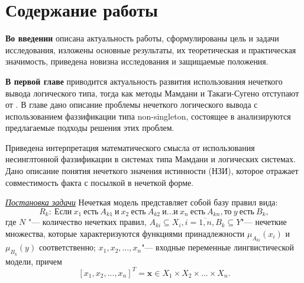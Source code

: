 \section*{Содержание работы}

\textbf{Во введении} описана актуальность работы, сформулированы цель и задачи исследования, изложены основные результаты, их теоретическая и практическая значимость, приведена новизна исследования и защищаемые положения. 


\textbf{В первой главе} приводится актуальность развития использования нечеткого вывода логического типа, тогда как методы Мамдани и Такаги-Сугено отступают от . В главе дано описание проблемы нечеткого логического вывода с использованием фаззификации типа non-singleton,  состоящее в анализируются предлагаемые подходы решения этих проблем.

Приведена интерпретация математического смысла от использования несинглтонной фаззификации в системах типа Мамдани и логических системах. Дано описание понятия нечеткого значения истинности (НЗИ), которое отражает совместимость факта с посылкой в нечеткой форме.

\underline{\textit{Постановка задачи}} 
Нечеткая модель представляет собой базу правил вида:
\begin{equation}
	\label{eqn:fuz-problem-1}
	R_k:\ \text{Если}\ x_1\ \text{есть}\ A_{k1}\ \text{и}\ x_2\ \text{есть}\ A_{k2}\ \text{и} \dots \text{и}\ x_n\ \text{есть}\ A_{kn}, \text{то}\ y\ \text{есть}\ B_k,
\end{equation}
где $N$ "--- количество нечетких правил, $A_{ki} \subseteq X_i, i=\overline{1,n}, B_k \subseteq Y$"--- нечеткие множества, которые характеризуются функциями принадлежности $\mu_{A_{ki}}(x_i)$ и $\mu_{B_k}(y)$ соответственно; $x_1, x_2,…,x_n$"--- входные переменные лингвистической модели, причем
\[
[x_1, x_2, ..., x_n]^T = \mathbf{x} \in X_1 \times X_2 \times \dots \times X_n.
\]

